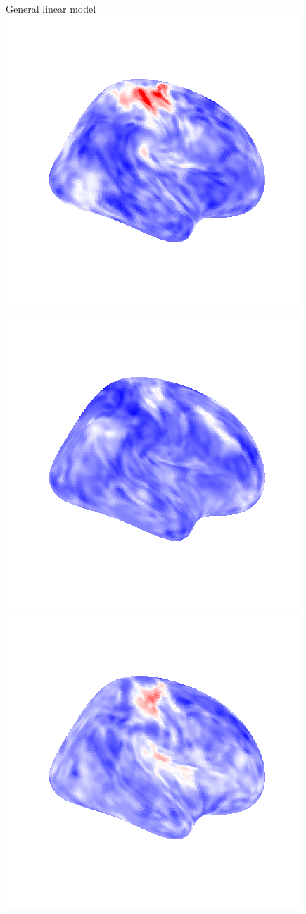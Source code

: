 \documentclass[bigger]{beamer}
\begin{document}
\begin{frame}{General linear model}
  \includegraphics[scale=0.20]{python/lr_button_3.png}
  \includegraphics[scale=0.20]{python/lr_button_4.png}
  \includegraphics[scale=0.20]{python/lr_button_5.png}

\end{frame}
\end{document}
